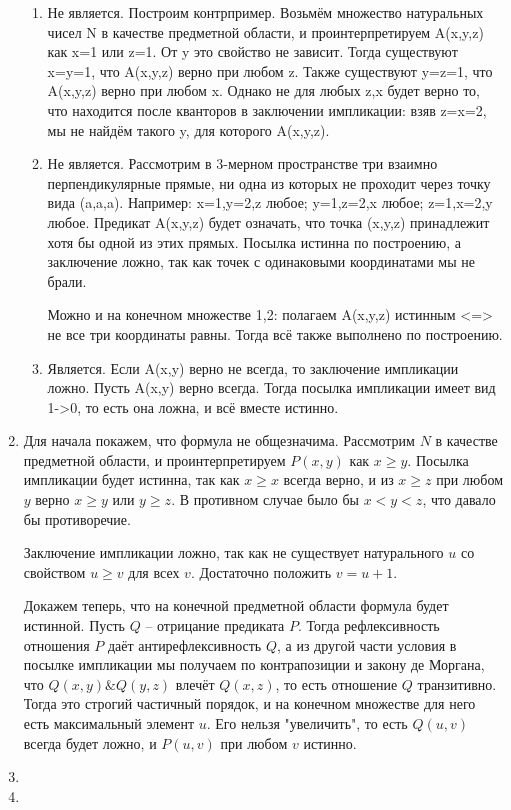 \documentclass[11pt]{article}
\begin{document}
\begin{enumerate}
\begin{enumerate}
			\item Не является. Построим контрпример. Возьмём множество натуральных чисел N в качестве предметной области, и проинтерпретируем A(x,y,z) как x=1 или z=1. От y это свойство не зависит. Тогда существуют x=y=1, что A(x,y,z) верно при любом z. Также существуют y=z=1, что A(x,y,z) верно при любом x. Однако не для любых z,x будет верно то, что находится после кванторов в заключении импликации: взяв z=x=2, мы не найдём такого y, для которого A(x,y,z).
			
			\item Не является. Рассмотрим в 3-мерном пространстве три взаимно перпендикулярные прямые, ни одна из которых не проходит через точку вида (a,a,a). Например: x=1,y=2,z любое; y=1,z=2,x любое; z=1,x=2,y любое. Предикат A(x,y,z) будет означать, что точка (x,y,z) принадлежит хотя бы одной из этих прямых. Посылка истинна по построению, а заключение ложно, так как точек с одинаковыми координатами мы не брали.
			
			Можно и на конечном множестве {1,2}: полагаем A(x,y,z) истинным <=> не все три координаты равны. Тогда всё также выполнено по построению.
			
			\item Является. Если A(x,y) верно не всегда, то заключение импликации ложно. Пусть A(x,y) верно всегда. Тогда посылка импликации имеет вид 1->0, то есть она ложна, и всё вместе истинно.
		\end{enumerate}
	\item Для начала покажем, что формула не общезначима. Рассмотрим $N$ в качестве предметной области, и проинтерпретируем $P(x,y)$ как $x\ge y$. Посылка импликации будет истинна, так как $x\ge x$ всегда верно, и из $x\ge z$ при любом $y$ верно $x\ge y$ или $y\ge z$. В противном случае было бы $x < y < z$, что давало бы противоречие.
	
	Заключение импликации ложно, так как не существует натурального $u$ со свойством $u\ge v$ для всех $v$. Достаточно положить $v=u+1$.
	
	Докажем теперь, что на конечной предметной области формула будет истинной. Пусть $Q$ -- отрицание предиката $P$. Тогда рефлексивность отношения $P$ даёт антирефлексивность $Q$, а из другой части условия в посылке импликации мы получаем по контрапозиции и закону де Моргана, что $Q(x,y)\& Q(y,z)$ влечёт $Q(x,z)$, то есть отношение $Q$ транзитивно. Тогда это строгий частичный порядок, и на конечном множестве для него есть максимальный элемент $u$. Его нельзя "увеличить", то есть $Q(u,v)$ всегда будет ложно, и $P(u,v)$ при любом $v$ истинно.
	\item 
	\item
	\end{enumerate}
\end{document}
